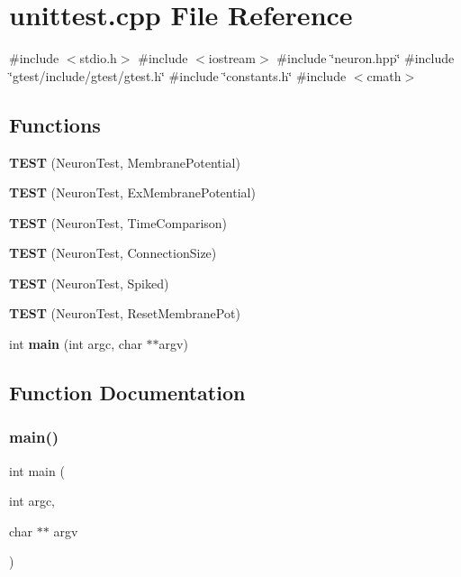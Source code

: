 \section{unittest.\+cpp File Reference}
\label{unittest_8cpp}
{\ttfamily \#include $<$stdio.\+h$>$}\newline
{\ttfamily \#include $<$iostream$>$}\newline
{\ttfamily \#include \char`\"{}neuron.\+hpp\char`\"{}}\newline
{\ttfamily \#include \char`\"{}gtest/include/gtest/gtest.\+h\char`\"{}}\newline
{\ttfamily \#include \char`\"{}constants.\+h\char`\"{}}\newline
{\ttfamily \#include $<$cmath$>$}\newline
\subsection*{Functions}
\begin{DoxyCompactItemize}
\item 
\textbf{ T\+E\+ST} (Neuron\+Test, Membrane\+Potential)
\item 
\textbf{ T\+E\+ST} (Neuron\+Test, Ex\+Membrane\+Potential)
\item 
\textbf{ T\+E\+ST} (Neuron\+Test, Time\+Comparison)
\item 
\textbf{ T\+E\+ST} (Neuron\+Test, Connection\+Size)
\item 
\textbf{ T\+E\+ST} (Neuron\+Test, Spiked)
\item 
\textbf{ T\+E\+ST} (Neuron\+Test, Reset\+Membrane\+Pot)
\item 
int \textbf{ main} (int argc, char $\ast$$\ast$argv)
\end{DoxyCompactItemize}


\subsection{Function Documentation}
\mbox{\label{unittest_8cpp_a3c04138a5bfe5d72780bb7e82a18e627}} 
\subsubsection{main()}
{\footnotesize\ttfamily int main (\begin{DoxyParamCaption}\item[{int}]{argc,  }\item[{char $\ast$$\ast$}]{argv }\end{DoxyParamCaption})}

